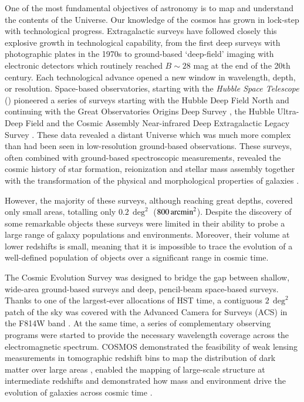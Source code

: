 \documentclass[longauth]{aa}
\begin{document}


One of the most fundamental objectives of astronomy is to map and understand the contents of the Universe. Our knowledge of the cosmos has grown in lock-step with technological progress. Extragalactic surveys have followed closely this explosive growth in technological capability, from the first deep surveys with photographic plates in the 1970s to ground-based `deep-field' imaging with electronic detectors which routinely reached $B\sim28$ mag at the end of the 20th century. Each technological advance opened a new window in wavelength, depth, or resolution. Space-based observatories, starting with the \textit{Hubble Space Telescope} (\hst) pioneered a series of surveys starting with the Hubble Deep Field North \citep[HDF-N][]{Williams1996} and continuing with the Great Observatories Origins Deep Survey \citep[GOODS,][]{Giavalisco2004}, the Hubble Ultra-Deep Field \citep[HUDF,][]{Beckwith2006, Ellis2013, Illingworth2013, Teplitz2013} and the Cosmic Assembly Near-infrared Deep Extragalactic Legacy Survey \citep[CANDELS,][]{Grogin2011, Koekemoer2011}. These data revealed a distant Universe which was much more complex than had been seen in low-resolution ground-based observations. These surveys, often combined with ground-based spectroscopic measurements, revealed the cosmic history of star formation, reionization and stellar mass assembly together with the transformation of the physical and morphological properties of galaxies \citep[e.g.,][for reviews]{MadauDickinson2014, Conselice_2014, Robertson2021}.

However, the majority of these surveys, although reaching great depths, covered only small areas, totalling only $0.2\, \si{\deg}^2$ ($800\, {\rm arcmin}^2$). Despite the discovery of some remarkable objects \cite[e.g.,][]{Oesch2016} these surveys were limited in their ability to probe a large range of galaxy populations and environments. Moreover, their volume at lower redshifts is small, meaning that it is impossible to trace the evolution of a well-defined population of objects over a significant range in cosmic time. 

The Cosmic Evolution Survey \citep[COSMOS,][]{scoville_cosmic_2007} was designed to bridge the gap between shallow, wide-area ground-based surveys and deep, pencil-beam space-based surveys. Thanks to one of the largest-ever  allocations of HST time, a contiguous $2\, \si{\deg}^2$ patch of the sky was covered with the Advanced Camera for Surveys (ACS) in the F814W band \citep{Koekemoer2007}. At the same time, a series of complementary observing programs were started to provide the necessary wavelength coverage across the electromagnetic spectrum. COSMOS demonstrated the feasibility of weak lensing measurements in tomographic redshift bins to map the distribution of dark matter over large areas \citep{Massey_2007}, enabled the mapping of large-scale structure at intermediate redshifts \citep{Scoville2013} and demonstrated how mass and environment drive the evolution of galaxies across cosmic time \citep{peng_mass_2010}. 
\end{document}
